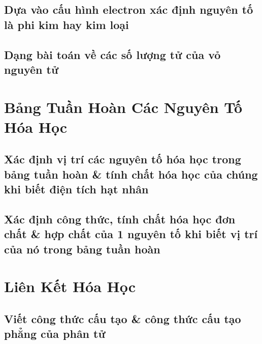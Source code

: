 \documentclass{article}
\numberwithin{equation}{section}
\begin{document}

\subsection{Dựa vào cấu hình electron xác định nguyên tố là phi kim hay kim loại}


\subsection{Dạng bài toán về các số lượng tử của vỏ nguyên tử}


\section{Bảng Tuần Hoàn Các Nguyên Tố Hóa Học}

\subsection{Xác định vị trí các nguyên tố hóa học trong bảng tuần hoàn \& tính chất hóa học của chúng khi biết điện tích hạt nhân}


\subsection{Xác định công thức, tính chất hóa học đơn chất \& hợp chất của 1 nguyên tố khi biết vị trí của nó trong bảng tuần hoàn}


\section{Liên Kết Hóa Học}

\subsection{Viết công thức cấu tạo \& công thức cấu tạo phẳng của phân tử}

\end{document}
